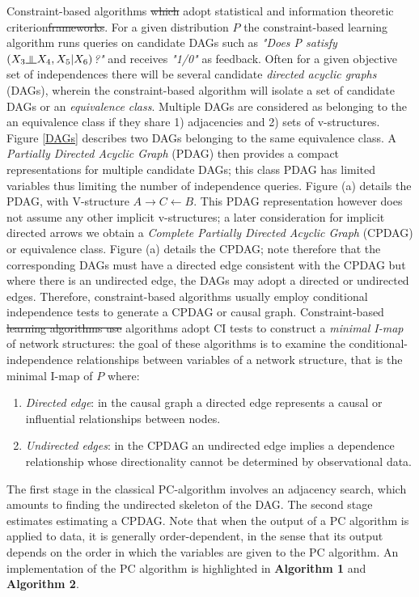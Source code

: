 \documentclass[7pt]{article}
\newcommand{\inperp}{\rotatebox[origin=c]{90}{$\models$}}
\begin{document}
{Constraint-based algorithms} \st{which} adopt statistical and information theoretic criterion\st{frameworks}. For a given distribution $P$ the constraint-based learning algorithm runs queries on candidate DAGs such as \emph{"Does P satisfy $(X_3 \inperp X_4,X_5 | X_6)$?"} and receives \emph{"1/0"} as feedback. Often for a given objective set of independences there will be several candidate \emph{directed acyclic graphs} (DAGs), wherein the constraint-based algorithm will isolate a set of candidate DAGs or an \emph{equivalence class}. Multiple DAGs are considered as belonging to the an equivalence class if they share 1) adjacencies and 2) sets of v-structures. Figure \ref{DAGs} describes two DAGs belonging to the same equivalence class. A \emph{Partially Directed Acyclic Graph} (PDAG) then provides a compact representations for multiple candidate DAGs; this class PDAG has limited variables thus limiting the number of independence queries. Figure (a) details the PDAG, with  V-structure $A \rightarrow C \leftarrow B$. This PDAG representation however does not assume any other implicit v-structures; a later consideration for implicit directed arrows we obtain a \emph{Complete Partially Directed Acyclic Graph} (CPDAG) or equivalence class. Figure (a) details the CPDAG; note therefore that the corresponding DAGs must have a directed edge consistent with the CPDAG but where there is an undirected edge, the DAGs may adopt a directed or undirected edges. Therefore, constraint-based algorithms usually employ conditional independence tests to generate a CPDAG or causal graph. {Constraint-based \st{learning algorithms use} algorithms adopt CI tests to construct a \emph{minimal I-map} of network structures: the goal of these algorithms is to examine the conditional-independence relationships  between variables of a network structure, that is the minimal I-map of $P$ where}:
\begin{enumerate}
\item \emph{Directed edge}: in the causal graph a directed edge represents a causal or influential relationships between nodes. 
\item \emph{Undirected edges}: in the CPDAG an undirected edge implies a dependence relationship whose directionality cannot be determined by observational data. 
\end{enumerate}
The first stage in the classical PC-algorithm involves an adjacency search, which amounts to finding the undirected skeleton of the DAG. The second stage estimates estimating a CPDAG. Note that when the output of a PC algorithm is applied to data, it is generally order-dependent, in the sense that its output depends on the order in which the variables are given to the PC algorithm. An implementation of the PC algorithm is highlighted in \textbf{Algorithm 1} and \textbf{Algorithm 2}. 
\end{document}
